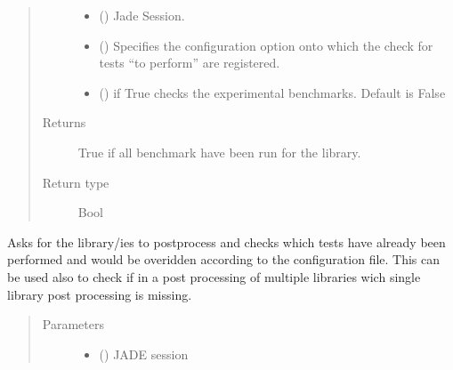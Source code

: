 \documentclass[letterpaper,10pt,english]{sphinxmanual}
\begin{document}
\begin{fulllineitems}
\begin{fulllineitems}
\begin{quote}
\begin{description}
\begin{itemize}
\item {} 
\sphinxAtStartPar
{} ({\hyperref[\detokenize{api/initobjects:main.Session}]{}}) \textendash{} Jade Session.

\item {} 
\sphinxAtStartPar
{} () \textendash{} Specifies the configuration option onto which the check for tests
“to perform” are registered.

\item {} 
\sphinxAtStartPar
{} () \textendash{} if True checks the experimental benchmarks. Default is False

\end{itemize}

\item[{Returns}] \leavevmode
\sphinxAtStartPar
{} \textendash{} True if all benchmark have been run for the library.

\item[{Return type}] \leavevmode
\sphinxAtStartPar
Bool

\end{description}\end{quote}

\end{fulllineitems}


\begin{fulllineitems}
\label{\detokenize{api/initobjects:status.Status.check_override_pp}}
\sphinxAtStartPar
Asks for the library/ies to post\sphinxhyphen{}process and checks which tests have
already been performed and would be overidden according to the
configuration file.
This can be used also to check if in a post processing of multiple
libraries wich single library post processing is missing.
\begin{quote}\begin{description}
\item[{Parameters}] \leavevmode\begin{itemize}
\item {} 
\sphinxAtStartPar
{} ({\hyperref[\detokenize{api/initobjects:main.Session}]{}}) \textendash{} JADE session


\end{itemize}
\end{description}
\end{quote}
\end{fulllineitems}
\end{fulllineitems}
\end{document}
